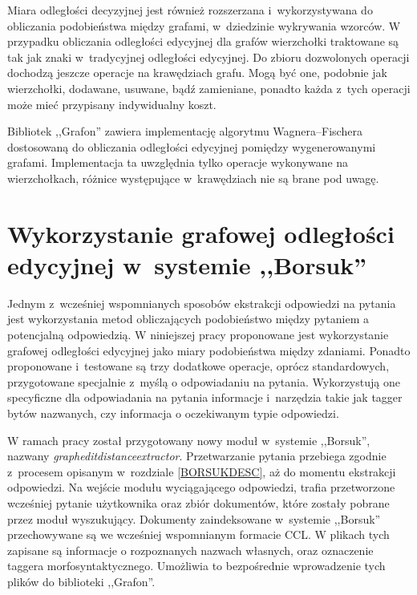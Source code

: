 \documentclass[a4paper, twoside, openright, 12pt]{report}
\begin{document}
        Miara odległości decyzyjnej jest również rozszerzana i~wykorzystywana do obliczania podobieństwa między grafami,
        w~dziedzinie wykrywania wzorców. W przypadku obliczania odległości edycyjnej dla grafów wierzchołki traktowane
        są tak jak znaki w~tradycyjnej odległości edycyjnej. Do zbioru dozwolonych operacji dochodzą jeszcze operacje
        na krawędziach grafu. Mogą być one, podobnie jak wierzchołki, dodawane, usuwane, bądź zamieniane, ponadto każda
        z~tych operacji może mieć przypisany indywidualny koszt.

        Bibliotek ,,Grafon'' zawiera implementację algorytmu Wagnera–Fischera dostosowaną do obliczania odległości
        edycyjnej pomiędzy wygenerowanymi grafami. Implementacja ta uwzględnia tylko operacje wykonywane na wierzchołkach,
        różnice występujące w~krawędziach nie są brane pod uwagę.

    \section{Wykorzystanie grafowej odległości edycyjnej w~systemie ,,Borsuk''}
        Jednym z~wcześniej wspomnianych sposobów ekstrakcji odpowiedzi na pytania jest wykorzystania metod obliczających
        podobieństwo między pytaniem a potencjalną odpowiedzią. W niniejszej pracy proponowane jest wykorzystanie grafowej
        odległości edycyjnej jako miary podobieństwa między zdaniami. Ponadto proponowane i~testowane są trzy dodatkowe
        operacje, oprócz standardowych, przygotowane specjalnie z~myślą o odpowiadaniu na pytania. Wykorzystują one
        specyficzne dla odpowiadania na pytania informacje i~narzędzia takie jak tagger bytów nazwanych, czy informacja
        o oczekiwanym typie odpowiedzi.

        W ramach pracy został przygotowany nowy moduł w~systemie ,,Borsuk'', nazwany \emph{grapheditdistanceextractor}.
        Przetwarzanie pytania przebiega zgodnie z~procesem opisanym w~rozdziale \ref{BORSUKDESC}, aż do momentu ekstrakcji
        odpowiedzi. Na wejście modułu wyciągającego odpowiedzi, trafia przetworzone wcześniej pytanie użytkownika oraz
        zbiór dokumentów, które zostały pobrane przez moduł wyszukujący. Dokumenty zaindeksowane w~systemie ,,Borsuk''
        przechowywane są we wcześniej wspomnianym formacie CCL. W plikach tych zapisane są informacje o rozpoznanych
        nazwach własnych, oraz oznaczenie taggera morfosyntaktycznego. Umożliwia to bezpośrednie wprowadzenie tych plików
        do biblioteki ,,Grafon''.
\end{document}
